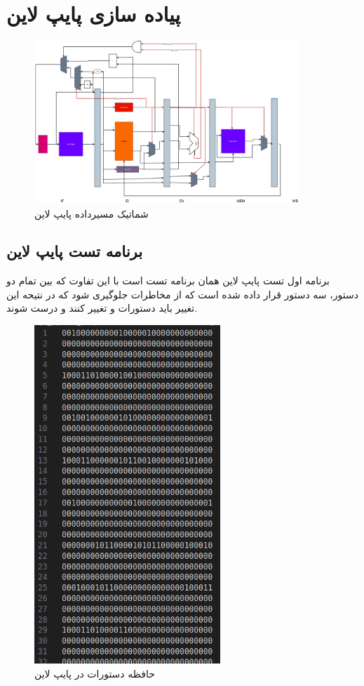 \documentclass[11pt, a4paper]{article}
\begin{document}
	
	\section{پیاده سازی پایپ لاین}
	
	\begin{figure}[H]
		\begin{center}
			\includegraphics[width=10cm]{Photos/Pipeline_Figure.jpg}
		\end{center}
		\caption{شماتیک مسیرداده پایپ لاین}
		\label{Pipeline_schamitic}
	\end{figure}
 

	\subsection{برنامه تست پایپ لاین}
	برنامه اول تست پایپ لاین همان برنامه تست 
	است با این تفاوت که بین تمام دو دستور، سه دستور 
	قرار داده شده است که از مخاطرات جلوگیری شود که در نتیحه این تغییر باید دستورات 
	و
	تغییر کنند و درست شوند. 
	\begin{figure}[H]
		\begin{center}
			\includegraphics[width=7cm]{Photos/4.png}
		\end{center}
		\caption{حافظه دستورات در پایپ لاین}
		\label{Pipeline_inst_test}
	\end{figure}
	
\end{document}
